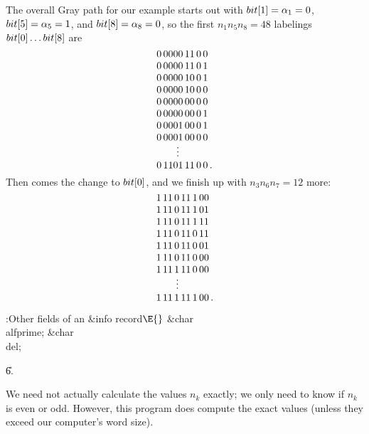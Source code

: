 \fi

The overall Gray path for our example starts out with
$\\{bit}[1]=\alpha_1=0$, $\\{bit}[5]=\alpha_5=1$,
and $\\{bit}[8]=\allowbreak\alpha_8=0$,
so the first $n_1n_5n_8=48$ labelings $\\{bit}[0]\ldots\\{bit}[8]$ are
$$\vbox{\halign{$#$\hfill\cr
0\,0000\,11\,0\,0\cr
0\,0000\,11\,0\,1\cr
0\,0000\,10\,0\,1\cr
0\,0000\,10\,0\,0\cr
0\,0000\,00\,0\,0\cr
0\,0000\,00\,0\,1\cr
0\,0001\,00\,0\,1\cr
0\,0001\,00\,0\,0\cr
\qquad\vdots\cr
0\,1101\,11\,0\,0\,.\cr}}$$
Then comes the change to $\\{bit}[0]$, and we finish up with $n_3n_6n_7=12$ more:
$$\vbox{\halign{$#$\hfill\cr
1\,11\,0\,11\,1\,00\cr
1\,11\,0\,11\,1\,01\cr
1\,11\,0\,11\,1\,11\cr
1\,11\,0\,11\,0\,11\cr
1\,11\,0\,11\,0\,01\cr
1\,11\,0\,11\,0\,00\cr
1\,11\,1\,11\,0\,00\cr
\qquad\vdots\cr
1\,11\,1\,11\,1\,00\,.\cr}}$$

\fi

\B{}:Other fields of an \&{info} record\X${}\E{}$\6
\&{char} \\{alfprime};\6
\&{char} \\{del};\par
\U6.\fi

We need not actually calculate the values $n_k$ exactly; we only need
to know if $n_k$ is even or odd. However, this program does compute the
exact values (unless they exceed our computer's word size).

